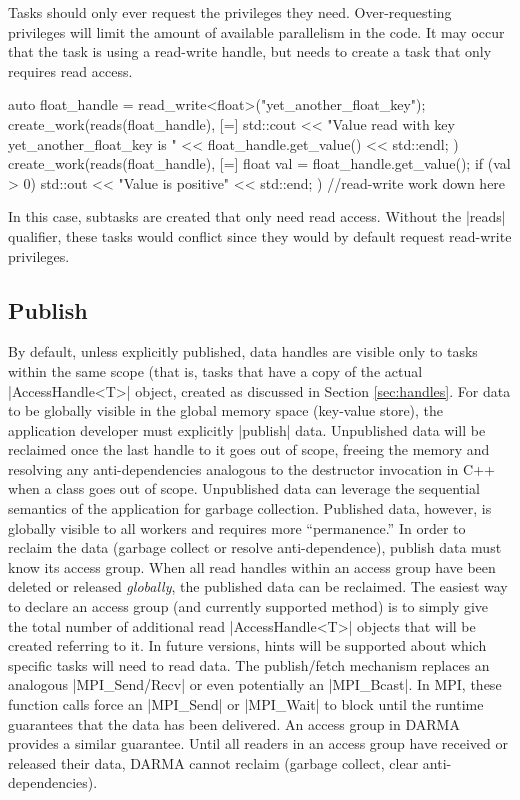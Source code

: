 Tasks should only ever request the privileges they need. 
Over-requesting privileges will limit the amount of available parallelism in the code.
It may occur that the task is using a read-write handle, but needs to create a
task that only requires read access.

\begin{CppCode}
auto float_handle = read_write<float>("yet_another_float_key");
create_work(reads(float_handle), [=] {
  std::cout << "Value read with key yet_another_float_key is " 
          << float_handle.get_value() << std::endl;
})
create_work(reads(float_handle), [=] {
  float val = float_handle.get_value();
  if (val > 0) std::out << "Value is positive" << std::end;
})
//read-write work down here
\end{CppCode}
In this case, subtasks are created that only need read access. 
Without the |reads| qualifier, these tasks would conflict since they
would by default request read-write privileges.

\subsection{Publish}
\label{subsec:publish}
By default, unless explicitly published, data handles are visible only to tasks
within the same scope (that is, tasks that have a copy of the actual
|AccessHandle<T>| object, created as discussed in
Section \ref{sec:handles}.
For data to be globally visible in the global memory space (key-value store),
the application developer must explicitly |publish| data.  Unpublished 
data will be reclaimed once the last handle to it goes out of scope,
freeing the memory and resolving any anti-dependencies analogous to the
destructor invocation in C++ when a class goes out of scope.  Unpublished data
can leverage the sequential semantics of the application for garbage
collection.  Published data, however, is globally visible to all workers and
requires more ``permanence.''  In order to reclaim the data (garbage collect or
resolve anti-dependence), publish data must know its access group.
When all read handles within an access group have been deleted or released
\emph{globally}, the published data can be reclaimed.
The easiest way to declare an access group (and currently supported method) is
to simply give the total number of additional read |AccessHandle<T>|
objects that will be created referring to it.
In future versions, hints will be supported about which specific tasks will need
to read data.
The publish/fetch mechanism replaces an analogous |MPI_Send/Recv| or
even potentially an |MPI_Bcast|.
In MPI, these function calls force an |MPI_Send| or
|MPI_Wait| to block until the runtime guarantees that the data has
been delivered.
An access group in DARMA provides a similar guarantee.
Until all readers in an access group have received or released their data, DARMA
cannot reclaim (garbage collect, clear anti-dependencies).

